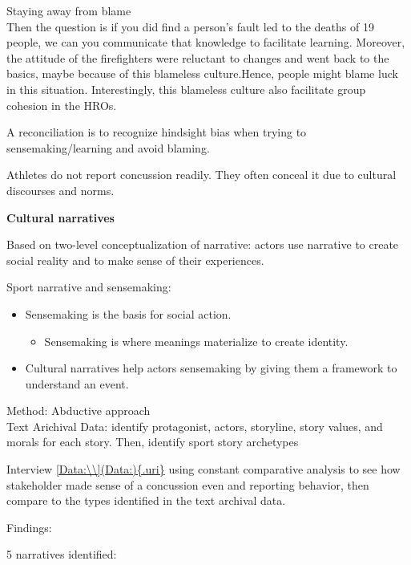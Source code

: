 \documentclass[
]{book}
\providecommand{\tightlist}{%
  \setlength{\itemsep}{0pt}\setlength{\parskip}{0pt}}
\begin{document}
Staying away from blame\\
Then the question is if you did find a person's fault led to the deaths of 19 people, we can you communicate that
knowledge to facilitate learning. Moreover, the attitude of the firefighters were reluctant to changes and went back to
the basics, maybe because of this blameless culture.Hence, people might blame luck in this situation. Interestingly,
this blameless culture also facilitate group cohesion in the HROs.

A reconciliation is to recognize hindsight bias when trying to sensemaking/learning and avoid blaming.

\citep{Zanin_2019}

Athletes do not report concussion readily. They often conceal it due to cultural discourses and norms.

\textbf{Cultural narratives}

Based on \citep{Polkinghorne_1995} two-level conceptualization of narrative: actors use narrative to create social reality
and to make sense of their experiences.

Sport narrative and sensemaking:

\begin{itemize}
\item
  Sensemaking is the basis for social action.

  \begin{itemize}
  \tightlist
  \item
    Sensemaking is where meanings materialize to create identity.
  \end{itemize}
\item
  Cultural narratives help actors sensemaking by giving them a framework to understand an event.
\end{itemize}

Method: Abductive approach\\
Text Arichival Data: identify protagonist, actors, storyline, story values, and morals for each story. Then, identify
sport story archetypes

Interview \href{\%5BData:\%5D(Data:)\%7B.uri\%7D}{{[}Data:\textbackslash\textbackslash{]}(Data:)\{.uri\}} using constant comparative analysis to see how
stakeholder made sense of a concussion even and reporting behavior, then compare to the types identified in the text
archival data.

Findings:

5 narratives identified:
\end{document}
